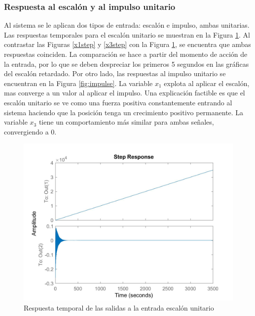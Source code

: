 \documentclass[journal]{IEEEtran}
\begin{document}
\subsubsection*{Respuesta al escalón y al impulso unitario}
Al sistema se le aplican dos tipos de entrada: escalón e impulso, ambas unitarias. Las respuestas temporales para el escalón unitario se muestran en la Figura \ref{fig:step}. Al contrastar las Figuras \ref{x1step} y \ref{x3step} con la Figura \ref{fig:step}, se encuentra que ambas respuestas coinciden. La comparación se hace a partir del momento de acción de la entrada, por lo que se deben despreciar los primeros 5 segundos en las gráficas del escalón retardado. Por otro lado, las respuestas al impulso unitario se encuentran en la Figura \ref{fig:impulse}. La variable $x_1$ explota al aplicar el escalón, mas converge a un valor al aplicar el impulso. Una explicación factible es que el escalón unitario se ve como una fuerza positiva constantemente entrando al sistema haciendo que la posición tenga un crecimiento positivo permanente. La variable $x_3$ tiene un comportamiento más similar para ambas señales, convergiendo a 0.\\      
\begin{figure}[ht!]
\caption{Respuesta temporal de las salidas a la entrada escalón unitario\label{fig:step}}
  \centering
\includegraphics[scale=0.18]{tf/step.jpg}
\end{figure}
\end{document}
